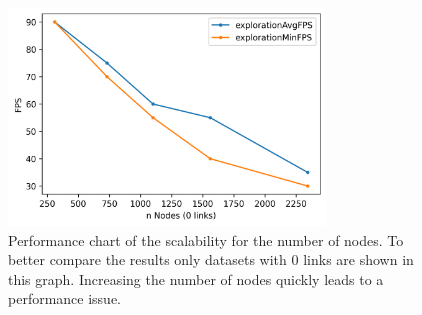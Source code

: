 \begin{table}[!hbt]
     \caption[Results from the performance evaluation.]{Results from the performance evaluation, separated into duration of the layout phase in seconds and render performance in FPS during the exploration phase. Test setup: Ryzen 7 3700X + Radeon RX 590.}
     \label{table:resultFPS}
\end{table}

\begin{figure}[!hbt]
    \centering
    \includegraphics[width=0.75\textwidth]{graphics/performanceAnalysisNodes2.png}
    \caption[Performance chart of the scalability for the number of nodes.]{Performance chart of the scalability for the number of nodes. To better compare the results only datasets with 0 links are shown in this graph. Increasing the number of nodes quickly leads to a performance issue.} 
    \label{fig:performanceNodes} 
\end{figure}


